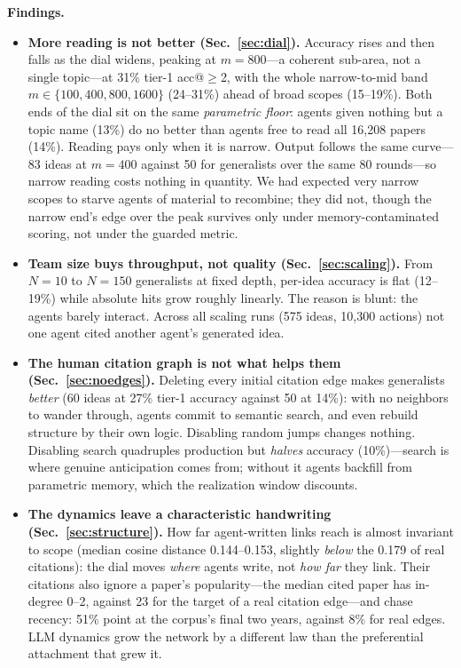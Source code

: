 \documentclass{article} %
\begin{document}
\textbf{Findings.}
\begin{itemize}
\item \textbf{More reading is not better (Sec.~\ref{sec:dial}).}
  Accuracy rises and then falls as the dial widens, peaking at $m{=}800$---a
  coherent sub-area, not a single topic---at 31\% tier-1 acc@$\geq$2, with
  the whole narrow-to-mid band $m \in \{100, 400, 800, 1600\}$ (24--31\%)
  ahead of broad scopes (15--19\%). Both ends of the dial sit on the same
  \emph{parametric floor}: agents given nothing but a topic name (13\%) do
  no better than agents free to read all 16{,}208 papers (14\%). Reading
  pays only when it is narrow. Output follows the same curve---83 ideas at
  $m{=}400$ against 50 for generalists over the same 80 rounds---so narrow
  reading costs nothing in quantity. We had expected very narrow scopes to
  starve agents of material to recombine; they did not, though the narrow
  end's edge over the peak survives only under memory-contaminated scoring,
  not under the guarded metric.
\item \textbf{Team size buys throughput, not quality
  (Sec.~\ref{sec:scaling}).} From $N{=}10$ to $N{=}150$ generalists at
  fixed depth, per-idea accuracy is flat (12--19\%) while absolute hits grow
  roughly linearly. The reason is blunt: the agents barely interact. Across
  all scaling runs (575 ideas, 10{,}300 actions) not one agent cited another
  agent's generated idea.
\item \textbf{The human citation graph is not what helps them
  (Sec.~\ref{sec:noedges}).} Deleting every initial citation edge makes
  generalists \emph{better} (60 ideas at 27\% tier-1 accuracy against 50 at
  14\%): with no neighbors to wander through, agents commit to semantic
  search, and even rebuild structure by their own logic. Disabling random
  jumps changes nothing. Disabling search quadruples production but
  \emph{halves} accuracy (10\%)---search is where genuine anticipation comes
  from; without it agents backfill from parametric memory, which the
  realization window discounts.
\item \textbf{The dynamics leave a characteristic handwriting
  (Sec.~\ref{sec:structure}).} How far agent-written links reach is almost
  invariant to scope (median cosine distance 0.144--0.153, slightly
  \emph{below} the 0.179 of real citations): the dial moves \emph{where}
  agents write, not \emph{how far} they link. Their citations also ignore a
  paper's popularity---the median cited paper has in-degree 0--2, against 23
  for the target of a real citation edge---and chase recency: 51\% point at
  the corpus's final two years, against 8\% for real edges. LLM dynamics
  grow the network by a different law than the preferential attachment
  \citep{barabasi1999emergence} that grew it.
\end{itemize}
\end{document}
